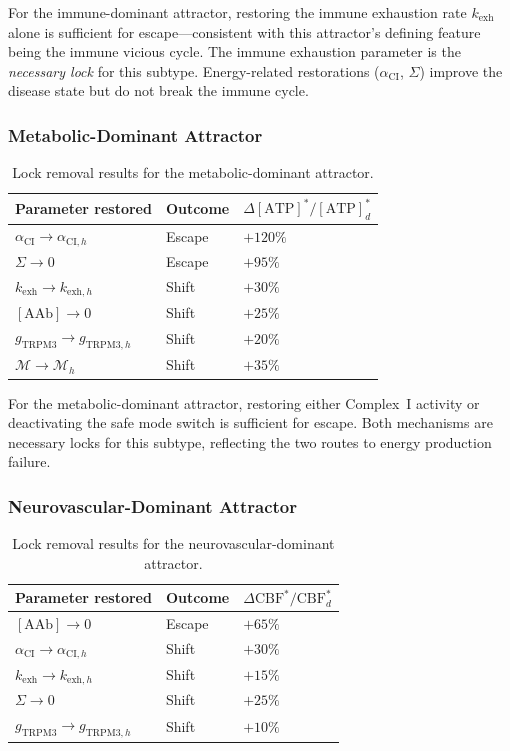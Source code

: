 For the immune-dominant attractor, restoring the immune exhaustion rate $k_{\text{exh}}$ alone is sufficient for escape---consistent with this attractor's defining feature being the immune vicious cycle. The immune exhaustion parameter is the \emph{necessary lock} for this subtype. Energy-related restorations ($\alpha_{\text{CI}}$, $\Sigma$) improve the disease state but do not break the immune cycle.

\subsubsection{Metabolic-Dominant Attractor}

\begin{table}[htbp]
\centering
\caption{Lock removal results for the metabolic-dominant attractor.}
\label{tab:lock-metabolic}
\begin{tabular}{lll}
\hline
Parameter restored & Outcome & $\Delta[\text{ATP}]^*/[\text{ATP}]_d^*$ \\
\hline
$\alpha_{\text{CI}} \to \alpha_{\text{CI},h}$ & Escape & $+120\%$ \\
$\Sigma \to 0$ & Escape & $+95\%$ \\
$k_{\text{exh}} \to k_{\text{exh},h}$ & Shift & $+30\%$ \\
$[\text{AAb}] \to 0$ & Shift & $+25\%$ \\
$g_{\text{TRPM3}} \to g_{\text{TRPM3},h}$ & Shift & $+20\%$ \\
$\mathcal{M} \to \mathcal{M}_h$ & Shift & $+35\%$ \\
\hline
\end{tabular}
\end{table}

For the metabolic-dominant attractor, restoring either Complex~I activity or deactivating the safe mode switch is sufficient for escape. Both mechanisms are necessary locks for this subtype, reflecting the two routes to energy production failure.

\subsubsection{Neurovascular-Dominant Attractor}

\begin{table}[htbp]
\centering
\caption{Lock removal results for the neurovascular-dominant attractor.}
\label{tab:lock-neurovascular}
\begin{tabular}{lll}
\hline
Parameter restored & Outcome & $\Delta\text{CBF}^*/\text{CBF}_d^*$ \\
\hline
$[\text{AAb}] \to 0$ & Escape & $+65\%$ \\
$\alpha_{\text{CI}} \to \alpha_{\text{CI},h}$ & Shift & $+30\%$ \\
$k_{\text{exh}} \to k_{\text{exh},h}$ & Shift & $+15\%$ \\
$\Sigma \to 0$ & Shift & $+25\%$ \\
$g_{\text{TRPM3}} \to g_{\text{TRPM3},h}$ & Shift & $+10\%$ \\
\hline
\end{tabular}
\end{table}

